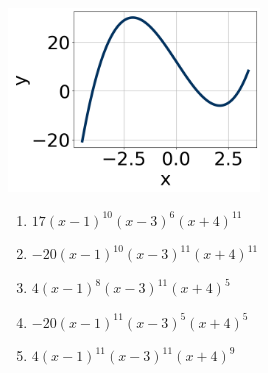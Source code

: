 \documentclass[14pt]{extbook}
\begin{document}
\begin{enumerate}
{\begin{center}
    \includegraphics[width=0.5\textwidth]{../Figures/polyGraphToFunctionC.png}
\end{center}
\begin{enumerate}[label=\Alph*.]
\item \( 17(x - 1)^{10} (x - 3)^{6} (x + 4)^{11} \)
\item \( -20(x - 1)^{10} (x - 3)^{11} (x + 4)^{11} \)
\item \( 4(x - 1)^{8} (x - 3)^{11} (x + 4)^{5} \)
\item \( -20(x - 1)^{11} (x - 3)^{5} (x + 4)^{5} \)
\item \( 4(x - 1)^{11} (x - 3)^{11} (x + 4)^{9} \)

\end{enumerate} }
\end{enumerate}
\end{document}
